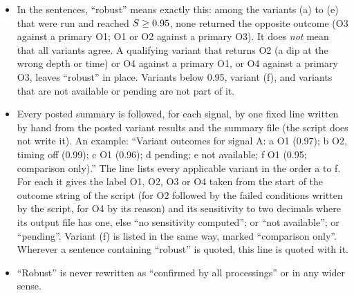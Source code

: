 \begin{itemize}
\item In the sentences, ``robust'' means exactly this: among the variants (a) to (e) that were run and reached
  $S \geq 0.95$, none returned the opposite outcome (O3 against a primary O1; O1 or O2 against a primary O3). It
  does \emph{not} mean that all variants agree. A qualifying variant that returns O2 (a dip at the wrong depth or time)
  or O4 against a primary O1, or O4 against a primary O3, leaves ``robust'' in place. Variants below 0.95, variant (f),
  and variants that are not available or pending are not part of it.
\item Every posted summary is followed, for each signal, by one fixed line written by hand from the posted variant
  results and the summary file (the script does not write it). An example: ``Variant outcomes for signal A: a O1 (0.97);
  b O2, timing off (0.99); c O1 (0.96); d pending; e not available; f O1 (0.95; comparison only).'' The line lists every
  applicable variant in the order a to f. For each it gives the label O1, O2, O3 or O4 taken from the start of the
  outcome string of the script (for O2 followed by the failed conditions written by the script, for O4 by its reason)
  and its sensitivity to two decimals where its output file has one, else ``no sensitivity computed''; or ``not
  available''; or ``pending''. Variant (f) is listed in the same way, marked ``comparison only''. Wherever a sentence
  containing ``robust'' is quoted, this line is quoted with it.
\item ``Robust'' is never rewritten as ``confirmed by all processings'' or in any wider sense.
\end{itemize}
